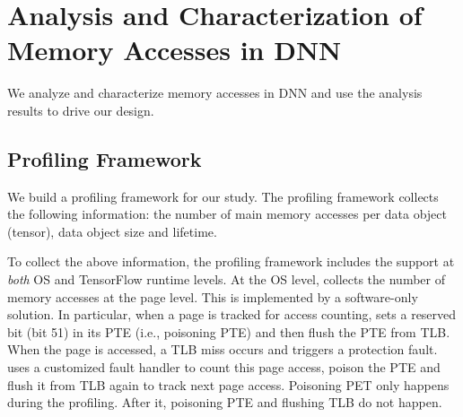 \section{Analysis and Characterization of Memory Accesses in DNN}
\label{sec:char}
We analyze and characterize memory accesses in DNN and use the analysis results to drive our design.


\subsection{Profiling Framework}
\label{sec:profiling_framework}

We build a profiling framework for our study.
The profiling framework collects the following information: the number of main memory accesses per data object (tensor), data object size and lifetime. 


To collect the above information, the profiling framework includes the support at \textit{both} OS and TensorFlow runtime levels. At the OS level, \name collects the number of memory accesses at the page level. This is implemented by a software-only solution. In particular, when a page is tracked for access counting, \name sets a reserved bit (bit 51) in its PTE (i.e., poisoning PTE) and then flush the PTE from TLB. When the page is accessed, a TLB miss occurs and triggers a protection fault. \name uses a customized fault handler to count this page access, poison the PTE and flush it from TLB again to track next page access. Poisoning PET only happens during the profiling. After it, poisoning PTE and flushing TLB do not happen. 



